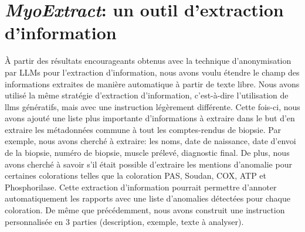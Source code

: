 \section{\textit{MyoExtract}: un outil d'extraction d'information}
À partir des résultats encourageants obtenus avec la technique d'anonymisation par LLMs pour l'extraction d'information, nous avons voulu étendre le champ des informations extraites de manière automatique à partir de texte libre. Nous avons utilisé la même stratégie d'extraction d'information, c'est-à-dire l'utilisation de \gls{llms} génératifs, mais avec une instruction légèrement différente. Cette fois-ci, nous avons ajouté une liste plus importante d'informations à extraire dans le but d'en extraire les métadonnées commune à tout les comptes-rendus de biopsie. Par exemple, nous avons cherché à extraire: les noms, date de naissance, date d'envoi de la biopsie, numéro de biopsie, muscle prélevé, diagnostic final. De plus, nous avons cherché à savoir s'il était possible d'extraire les mentions d'anomalie pour certaines colorations telles que la coloration PAS, Soudan, COX, ATP et Phosphorilase. Cette extraction d'information pourrait permettre d'annoter automatiquement les rapports avec une liste d'anomalies détectées pour chaque coloration. De même que précédemment, nous avons construit une instruction personnalisée en 3 parties (description, exemple, texte à analyser).

